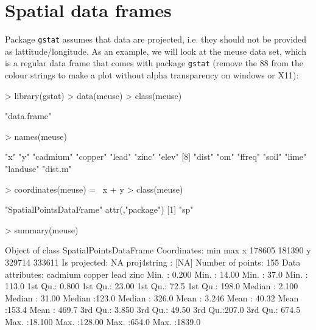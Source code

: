 \documentclass[a4paper]{article}
\newcommand{\code}[1]{{\tt #1}}
\begin{document}
\section{Spatial data frames}
Package \code{gstat} assumes that data are projected, i.e. they should
not be provided as lattitude/longitude. As an example, we will look
at the meuse data set, which is a regular data frame that comes with
package \code{gstat} (remove the 88 from the colour strings to make
a plot without alpha transparency on windows or X11):

\begin{Schunk}
\begin{Sinput}
> library(gstat)
> data(meuse)
> class(meuse)
\end{Sinput}
\begin{Soutput}
[1] "data.frame"
\end{Soutput}
\begin{Sinput}
> names(meuse)
\end{Sinput}
\begin{Soutput}
 [1] "x"       "y"       "cadmium" "copper"  "lead"    "zinc"    "elev"   
 [8] "dist"    "om"      "ffreq"   "soil"    "lime"    "landuse" "dist.m" 
\end{Soutput}
\begin{Sinput}
> coordinates(meuse) = ~x + y
> class(meuse)
\end{Sinput}
\begin{Soutput}
[1] "SpatialPointsDataFrame"
attr(,"package")
[1] "sp"
\end{Soutput}
\begin{Sinput}
> summary(meuse)
\end{Sinput}
\begin{Soutput}
Object of class SpatialPointsDataFrame
Coordinates:
     min    max
x 178605 181390
y 329714 333611
Is projected: NA 
proj4string : [NA]
Number of points: 155
Data attributes:
    cadmium           copper            lead            zinc       
 Min.   : 0.200   Min.   : 14.00   Min.   : 37.0   Min.   : 113.0  
 1st Qu.: 0.800   1st Qu.: 23.00   1st Qu.: 72.5   1st Qu.: 198.0  
 Median : 2.100   Median : 31.00   Median :123.0   Median : 326.0  
 Mean   : 3.246   Mean   : 40.32   Mean   :153.4   Mean   : 469.7  
 3rd Qu.: 3.850   3rd Qu.: 49.50   3rd Qu.:207.0   3rd Qu.: 674.5  
 Max.   :18.100   Max.   :128.00   Max.   :654.0   Max.   :1839.0  
                                                                   

\end{Soutput}
\end{Schunk}
\end{document}
